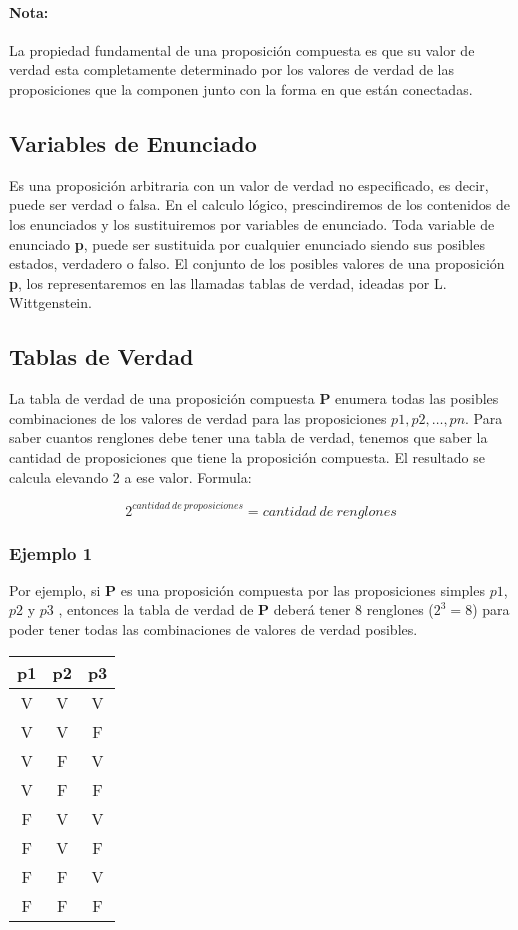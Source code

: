 \documentclass[a4paper,11pt,oneside,titlepage,final]{scrartc}
\begin{document}
\paragraph{Nota:} La propiedad fundamental de una proposición compuesta es que su valor de verdad esta completamente determinado por los valores de verdad de las proposiciones que la componen junto con la forma en que están conectadas.

\subsection{Variables de Enunciado}

Es una proposición arbitraria con un valor de verdad no especificado, es decir, puede ser verdad o falsa. En el calculo lógico, prescindiremos de los contenidos de los enunciados y los sustituiremos por variables de enunciado. Toda variable de enunciado \textbf{p}, puede ser sustituida por cualquier enunciado siendo sus posibles estados, verdadero o falso. El conjunto de los posibles valores de una proposición \textbf{p}, los representaremos en las llamadas tablas de verdad, ideadas por L. Wittgenstein.

\subsection{Tablas de Verdad}


La tabla de verdad de una proposición compuesta \textbf{P} enumera todas las posibles combinaciones de los valores de verdad para las proposiciones $p1,p2,\ldots,pn$. Para saber cuantos renglones debe tener una tabla de verdad, tenemos que saber la cantidad de proposiciones que tiene la proposición compuesta. El resultado se calcula elevando 2 a ese valor. Formula:

$$2^{cantidad~de~proposiciones} = cantidad~de~renglones$$

\subsubsection*{Ejemplo 1}

Por ejemplo, si \textbf{P} es una proposición compuesta por las proposiciones simples $p1$, $p2$ y $p3$ , entonces la tabla de verdad de \textbf{P} deberá tener 8 renglones ($2^{3}=8$) para poder tener todas las combinaciones de valores de verdad posibles.\\

\begin{tabular}{|c|c|c|}
\hline 
p1 & p2 & p3 \\ 
\hline 
V & V & V \\ 
\hline 
V & V & F \\ 
\hline 
V & F & V \\ 
\hline 
V & F & F \\ 
\hline 
F & V & V \\ 
\hline 
F & V & F \\ 
\hline 
F & F & V \\ 
\hline 
F & F & F \\ 
\hline 
\end{tabular}
\end{document}
